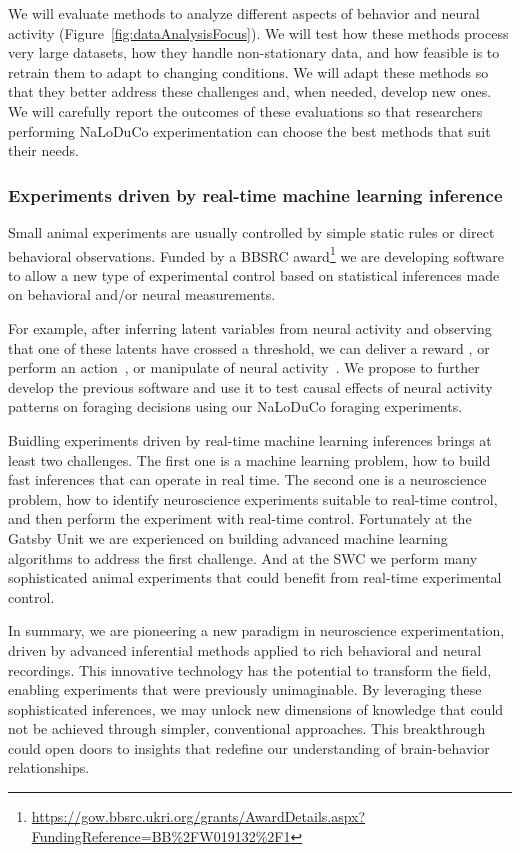 We will evaluate methods to analyze different aspects of behavior and neural
activity (Figure~\ref{fig:dataAnalysisFocus}).
%
We will test how these methods process very large datasets, how they handle
non-stationary data, and how feasible is to retrain them to adapt to
changing conditions.
%
We will adapt these methods so that they better address these challenges and,
when needed, develop new ones.
%
We will carefully report the outcomes of these evaluations so that researchers
performing NaLoDuCo experimentation can choose the best methods that suit their
needs.

\subsubsection{Experiments driven by real-time machine learning inference}

Small animal experiments are usually controlled by simple static rules or
direct behavioral observations.
%
Funded by a BBSRC
award\footnote{\url{https://gow.bbsrc.ukri.org/grants/AwardDetails.aspx?FundingReference=BB\%2FW019132\%2F1}}
we are developing software to allow a new type of experimental control based on
statistical inferences made on behavioral and/or neural measurements.

For example, after inferring latent variables from neural activity and
observing that one of these latents have crossed a threshold, we can
deliver a reward \citep[as done in learning to control a
BCI;][]{clancyAndMrsicFlogel21}, or perform an action~\citep[as done in motor imagery
BCI;][]{lebedevAndNicolelis06}, or manipulate of neural activity~\citep[as
done when studying the causal relation between a pattern of brain activity and
behavior;][]{deisseroth15}.
%
We propose to further develop the previous software and use it to test causal
effects of neural activity patterns on foraging decisions using our NaLoDuCo
foraging experiments.

Buidling experiments driven by real-time machine learning inferences brings at
least two challenges. The first one is a machine learning problem, how to build
fast inferences that can operate in real time. The second one is a neuroscience
problem, how to identify neuroscience experiments suitable to real-time
control, and then perform the experiment with real-time control.
%
Fortunately at the Gatsby Unit we are experienced on building advanced machine
learning algorithms to address the first challenge. And at the SWC we perform
many sophisticated animal experiments that could benefit from real-time
experimental control.

In summary, we are pioneering a new paradigm in neuroscience experimentation,
driven by advanced inferential methods applied to rich behavioral and neural
recordings. This innovative technology has the potential to transform the
field, enabling experiments that were previously unimaginable. By leveraging
these sophisticated inferences, we may unlock new dimensions of knowledge that
could not be achieved through simpler, conventional approaches. This
breakthrough could open doors to insights that redefine our understanding of
brain-behavior relationships.



